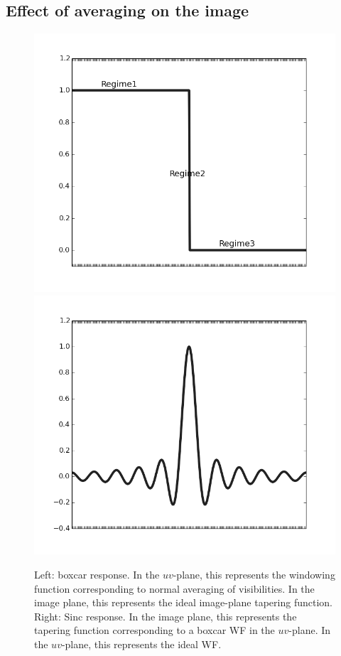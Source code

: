 \documentclass[useAMS,usenatbib]{mn2e}
\begin{document}
\subsection{Effect of averaging on the image}
\label{sec:effectbw}

\begin{figure}
\includegraphics[width=\columnwidth]{./Figures/idealIPRgrey.png}%
\includegraphics[width=\columnwidth]{./Figures/idealsincgrey.png}\\
\caption{Left: boxcar response. In the $uv$-plane, this represents the windowing function corresponding to normal
averaging of visibilities. In the image plane, this represents the ideal image-plane tapering function. Right: 
Sinc response. In the image plane, this represents the tapering function corresponding to a boxcar WF in 
the $uv$-plane. In the $uv$-plane, this represents the ideal WF.}
\label{fig:idealWF}
\end{figure}
\end{document}
